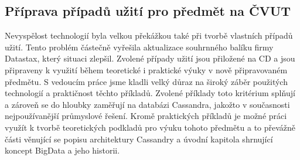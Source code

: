 \subsection{Příprava případů užití pro předmět na ČVUT}
Nevyspělost technologií byla velkou překážkou také při tvorbě vlastních případů užití. Tento problém částečně vyřešila aktualizace souhrnného balíku firmy Datastax, který situaci zlepšil. Zvolené případy užití jsou přiložené na CD a jsou připraveny k využití během teoretické i praktické výuky v nově připravovaném předmětu. S vedoucím práce jsme kladli velký důraz na široký záběr použitých technologií a praktičnost těchto příkladů. Zvolené příklady toto kritérium splňují a zároveň se do hloubky zaměřují na databázi Cassandra, jakožto v současnosti nejpoužívanější průmyslové řešení. Kromě praktických příkladů je možné práci využít k tvorbě teoretických podkladů pro výuku tohoto předmětu a to převážně části věnující se popisu architektury Cassandry a úvodní kapitola shrnující koncept BigData a jeho historii. 